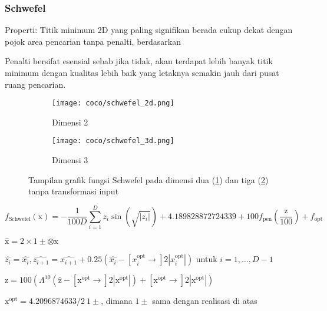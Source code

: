 \subsubsection{Schwefel}
\noindent Properti:
Titik minimum 2D yang paling signifikan berada cukup dekat dengan pojok area pencarian tanpa penalti, berdasarkan \citep{Schwefel1981}
\begin{packed_item}
  \item Penalti bersifat esensial sebab jika tidak, akan terdapat lebih banyak titik minimum dengan kualitas lebih baik yang letaknya semakin jauh dari pusat ruang pencarian.
\end{packed_item}
\begin{figure}[H]
	\centering
	\begin{subfigure}[b]{0.4\textwidth}
		\centering
		\texttt{[image: coco/schwefel\_2d.png]}
		\caption{Dimensi 2}
		\label{fig:schwefel_coco_2d}
	\end{subfigure}
	\hfill
	\begin{subfigure}[b]{0.4\textwidth}
		\centering
		\texttt{[image: coco/schwefel\_3d.png]}
		\caption{Dimensi 3}
		\label{fig:schwefel_coco_3d}
	\end{subfigure}
	\caption{Tampilan grafik fungsi Schwefel pada dimensi dua (\cref{fig:schwefel_coco_2d}) dan tiga (\cref{fig:schwefel_coco_3d}) tanpa transformasi input}
	\label{fig:schwefel_coco}
\end{figure}
\begin{equation}
  f_{\text{Schwefel}}(\mathrm{x})=-\frac{1}{100D}\sum_{i=1}^{D}z_i\sin(\sqrt{|z_i|})+4.189828872724339+100f_{\text{pen}}(\frac{\mathrm{z}}{100})+f_{\text{opt}}
\end{equation}
\begin{packed_item}
    \item $\hat{\mathrm{x}}=2\times 1\pm\otimes\mathrm{x}$
    \item $\hat{z_i}=\hat{x_i},\hat{z_{i+1}}=\hat{x_{i+1}}+0.25(\hat{x_i}-[x_i^{\text{opt}}\to]2|x_i^{\text{opt}}|)$ untuk $i=1,\ldots,D-1$
    \item $\mathrm{z}=100(\Lambda^{10}(\hat{\mathrm{z}}-[\mathrm{x}^{\text{opt}}\to]2|\mathrm{x}^{\text{opt}}|)+[\mathrm{x}^{\text{opt}}\to]2|\mathrm{x}^{\text{opt}}|)$
    \item $\mathrm{x}^{\text{opt}}=4.2096874633/2\ 1\pm$, dimana $1\pm$ sama dengan realisasi di atas
\end{packed_item}

